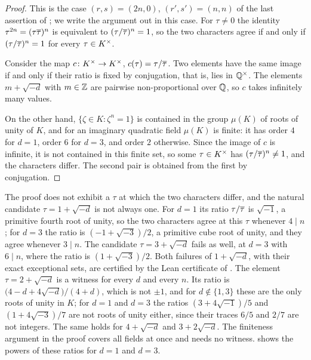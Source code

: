 \begin{proof}
This is the case $(r,s)=(2n,0)$, $(r',s')=(n,n)$ of the last assertion of
; we write the argument out in this case. For $\tau\ne0$
the identity $\tau^{2n}=(\tau\overline{\tau})^{n}$ is equivalent to
$(\tau/\overline{\tau})^{n}=1$, so the two characters agree if and only if
$(\tau/\overline{\tau})^{n}=1$ for every $\tau\in K^{\times}$.

Consider the map $c\colon K^{\times}\to K^{\times}$, $c(\tau)=\tau/\overline{\tau}$. Two elements
have the same image if and only if their ratio is fixed by conjugation, that
is, lies in $\mathbb{Q}^{\times}$. The elements $m+\sqrt{-d}$ with $m\in\mathbb{Z}$ are
pairwise non-proportional over $\mathbb{Q}$, so $c$ takes infinitely many values.

On the other hand, $\{\zeta\in K:\zeta^{n}=1\}$ is contained in the group
$\mu(K)$ of roots of unity of $K$, and for an imaginary quadratic field
$\mu(K)$ is finite: it has order $4$ for $d=1$, order $6$ for $d=3$, and order
$2$ otherwise. Since the image of $c$ is infinite, it is not contained in this
finite set, so some $\tau\in K^{\times}$ has $(\tau/\overline{\tau})^{n}\ne1$, and the
characters differ. The second pair is obtained from the first by conjugation.
\end{proof}

\begin{remark}\label{rem:witness}
The proof does not exhibit a $\tau$ at which the two characters differ, and
the natural candidate $\tau=1+\sqrt{-d}$ is not always one. For $d=1$ its
ratio $\tau/\overline{\tau}$ is $\sqrt{-1}$, a primitive fourth root of unity, so
the two characters agree at this $\tau$ whenever $4\mid n$; for $d=3$ the
ratio is $(-1+\sqrt{-3})/2$, a primitive cube root of unity, and they agree
whenever $3\mid n$. The candidate $\tau=3+\sqrt{-d}$ fails as well, at $d=3$
with $6\mid n$, where the ratio is $(1+\sqrt{-3})/2$. Both failures of
$1+\sqrt{-d}$, with their exact exceptional sets, are certified by the Lean certificate of
\cite{BMB26}. The element $\tau=2+\sqrt{-d}$ is a witness for every $d$
and every $n$. Its ratio is $\bigl(4-d+4\sqrt{-d}\bigr)/(4+d)$, which is not
$\pm1$, and for $d\notin\{1,3\}$ these are the only roots of unity in $K$;
for $d=1$ and $d=3$ the ratios $(3+4\sqrt{-1})/5$ and $(1+4\sqrt{-3})/7$ are
not roots of unity either, since their traces $6/5$ and $2/7$ are not
integers. The same holds for $4+\sqrt{-d}$ and $3+2\sqrt{-d}$. The finiteness
argument in the proof covers all fields at once and needs no witness.  shows the powers of these ratios for $d=1$ and $d=3$.
\end{remark}

